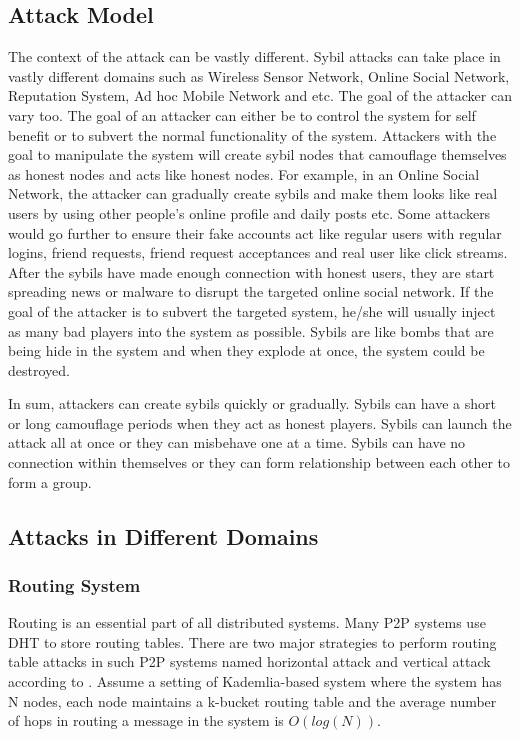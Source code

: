 \documentclass[conference]{IEEEtran}
\begin{document}
\subsection{Attack Model}
The context of the attack can be vastly different. Sybil attacks can take place in vastly different domains such as Wireless Sensor Network, Online Social Network, 
Reputation System, Ad hoc Mobile Network and etc. The goal of the attacker can vary too. The goal of an attacker can either be to control the system for self benefit
or to subvert the normal functionality of the system. Attackers with the goal to manipulate the system will create sybil nodes that camouflage themselves as honest nodes and
acts like honest nodes. For example, in an Online Social Network, the attacker can gradually create sybils and make them looks like real users by using other people's
online profile and daily posts etc. Some attackers would go further to ensure their fake accounts act like regular users with regular logins, friend requests,
friend request acceptances and real user like click streams. After the sybils have made enough connection with honest users, they are start spreading news or malware 
to disrupt the targeted online social network. If the goal of the attacker is to subvert the targeted system, he/she will usually inject as many bad players into the system
as possible. Sybils are like bombs that are being hide in the system and when they explode at once, the system could be destroyed.

In sum, attackers can create sybils quickly or gradually. Sybils can have a short or long camouflage periods when they act as honest players.
Sybils can launch the attack all at once or they can misbehave one at a time. Sybils can have no connection within themselves or they can form relationship between each other
to form a group.

\subsection{Attacks in Different Domains}
\subsubsection{Routing System}
Routing is an essential part of all distributed systems. Many P2P systems use DHT to store routing tables.
There are two major strategies to perform routing table attacks in such P2P systems named horizontal attack and vertical attack according to \cite{wang12dht}.
Assume a setting of Kademlia-based system\cite{maymounkov02kademlia} where the system has N nodes, each node maintains a k-bucket routing table and
the average number of hops in routing a message in the system is $O(log(N))$.
\end{document}
